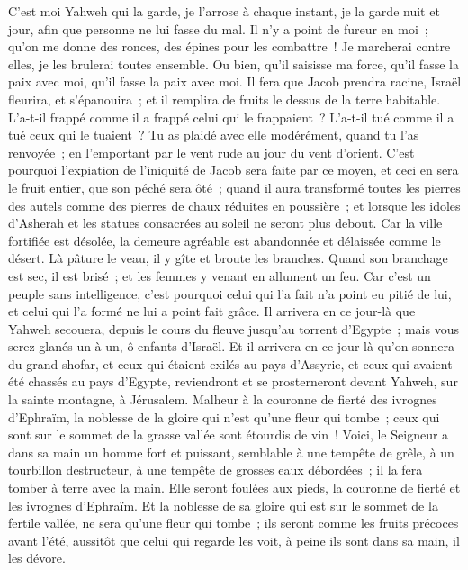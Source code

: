 \begin{multicols}{2}
C'est moi Yahweh qui la garde, je l'arrose à chaque instant, je la garde nuit et jour, afin que personne ne lui fasse du mal.
Il n'y a point de fureur en moi~; qu'on me donne des ronces, des épines pour les combattre~! Je marcherai contre elles, je les brulerai toutes ensemble.
Ou bien, qu'il saisisse ma force, qu'il fasse la paix avec moi, qu'il fasse la paix avec moi.
Il fera que Jacob prendra racine, Israël fleurira, et s'épanouira~; et il remplira de fruits le dessus de la terre habitable.
L'a-t-il frappé comme il a frappé celui qui le frappaient~? L'a-t-il tué comme il a tué ceux qui le tuaient~?
Tu as plaidé avec elle modérément, quand tu l'as renvoyée~; en l'emportant par le vent rude au jour du vent d'orient.
C'est pourquoi l'expiation de l'iniquité de Jacob sera faite par ce moyen, et ceci en sera le fruit entier, que son péché sera ôté~; quand il aura transformé toutes les pierres des autels comme des pierres de chaux réduites en poussière~; et lorsque les idoles d'Asherah et les statues consacrées au soleil ne seront plus debout.
Car la ville fortifiée est désolée, la demeure agréable est abandonnée et délaissée comme le désert. Là pâture le veau, il y gîte et broute les branches.
Quand son branchage est sec, il est brisé~; et les femmes y venant en allument un feu. Car c'est un peuple sans intelligence, c'est pourquoi celui qui l'a fait n'a point eu pitié de lui, et celui qui l'a formé ne lui a point fait grâce.
Il arrivera en ce jour-là que Yahweh secouera, depuis le cours du fleuve jusqu'au torrent d'Egypte~; mais vous serez glanés un à un, ô enfants d'Israël.
Et il arrivera en ce jour-là qu'on sonnera du grand shofar, et ceux qui étaient exilés au pays d'Assyrie, et ceux qui avaient été chassés au pays d'Egypte, reviendront et se prosterneront devant Yahweh, sur la sainte montagne, à Jérusalem.
\VerseOne{}Malheur à la couronne de fierté des ivrognes d'Ephraïm, la noblesse de la gloire qui n'est qu'une fleur qui tombe~; ceux qui sont sur le sommet de la grasse vallée sont étourdis de vin~!
Voici, le Seigneur a dans sa main un homme fort et puissant, semblable à une tempête de grêle, à un tourbillon destructeur, à une tempête de grosses eaux débordées~; il la fera tomber à terre avec la main.
Elle seront foulées aux pieds, la couronne de fierté et les ivrognes d'Ephraïm.
Et la noblesse de sa gloire qui est sur le sommet de la fertile vallée, ne sera qu'une fleur qui tombe~; ils seront comme les fruits précoces avant l'été, aussitôt que celui qui regarde les voit, à peine ils sont dans sa main, il les dévore. 

\end{multicols}
